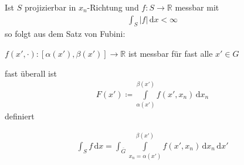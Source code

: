 \documentclass[a4paper,10pt]{scrbook}
\begin{document}
\begin{notice}
  Ist $S$ projizierbar in $x_n$-Richtung und $f : S \to \mathbb{R}$ messbar mit
  \begin{align*}
    \int_S |f| \, \mathrm{d}x < \infty
  \end{align*}
  so folgt aus dem Satz von Fubini:
  \begin{enum-arab}
    \item $f(x',\cdot) : [\alpha(x'),\beta(x')] \to \mathbb{R}$ ist messbar für fast alle $x' \in G$

    \item fast überall ist
    \begin{align*}
      F(x') \coloneq \int\limits_{\alpha(x')}^{\beta(x')} f(x',x_n) \, \mathrm{d}x_n
    \end{align*}
    definiert

    \item
    \begin{align*}
      \int_S f \, \mathrm{d}x = \int_{\overline{G}} \int\limits_{x_n = \alpha(x')}^{\beta(x')} f(x',x_n) \, \mathrm{d}x_n \, \mathrm{d}x'
    \end{align*}
  \end{enum-arab}
\end{notice}
\end{document}
